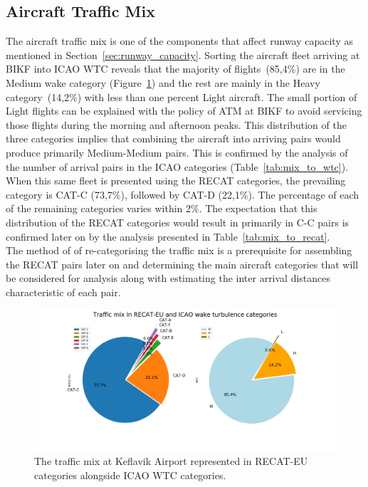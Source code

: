 \subsection{Aircraft Traffic Mix\label{ssec:traffic_mix}}
The aircraft traffic mix is one of the components that affect runway capacity as mentioned in Section~\ref{sec:runway_capacity}. Sorting the aircraft fleet arriving at BIKF into ICAO WTC reveals that the majority of flights~(85,4\%) are in the Medium wake category (Figure~\ref{fig:post_fast_exit_mix_pie_v2}) and the rest are mainly in the Heavy category~(14,2\%) with less than one percent Light aircraft. The small portion of Light flights can be explained with the policy of ATM at BIKF to avoid servicing those flights during the morning and afternoon peaks. This distribution of the three categories implies that combining the aircraft into arriving pairs would produce primarily Medium-Medium pairs. This is confirmed by the analysis of the number of arrival pairs in the ICAO categories (Table~\ref{tab:mix_to_wtc}).\\
When this same fleet is presented using the RECAT categories, the prevailing category is CAT-C (73,7\%), followed by CAT-D (22,1\%). The percentage of each of the remaining categories varies within 2\%. The expectation that this distribution of the RECAT categories would result in primarily in C-C pairs is confirmed later on by the analysis presented in Table~\ref{tab:mix_to_recat}. \\
The method of of re-categorising the traffic mix is a prerequisite for assembling the RECAT pairs later on and determining the main aircraft categories that will be considered for analysis along with estimating the inter arrival distances characteristic of each pair.
\begin{figure}[h]
    \centering
    \includegraphics[width=1\textwidth]{graphics/fig_post_fast_exit_mix_pie_v2.png}
    \caption[Traffic mix in RECAT-EU and ICAO WTC]{The traffic mix at Keflavik Airport represented in RECAT-EU categories alongside ICAO WTC categories.}
    \label{fig:post_fast_exit_mix_pie_v2}
\end{figure}
